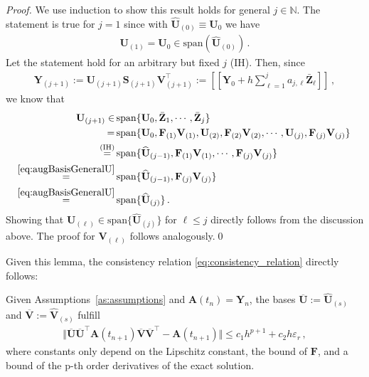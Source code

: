 \documentclass[preprint,runningheads]{svjour3}
\def\wh{\widehat}
\def\wt{\widetilde}
\def\wt{\overline}
\newcommand\bfA{{\mathbf A}}
\newcommand\bfF{{\mathbf F}}
\newcommand\bfS{{\mathbf S}}
\newcommand\bfU{{\mathbf U}}
\newcommand\bfV{{\mathbf V}}
\newcommand\bfY{{\mathbf Y}}
\newcommand\bfZ{{\mathbf Z}}
\begin{document}
\begin{proof}
We use induction to show this result holds for general $j\in\mathbb{N}$. The statement is true for $j=1$ since with $\widehat \bfU_{(0)} \equiv \bfU_{0}$ we have
\begin{align*}
    \bfU_{(1)} = \bfU_{0} \in \text{span}(\widehat \bfU_{(0)})\,.
\end{align*}
Let the statement hold for an arbitrary but fixed $j$ (IH). Then, since
\begin{align}
    \bfY_{(j+1)}:= \bfU_{(j+1)}\bfS_{(j+1)}\bfV_{(j+1)}^{\top} := [\![\bfY_0 + h\sum_{\ell = 1}^{j}a_{j,\ell}\bar \bfZ_{\ell}]\!]\,,
\end{align}
we know that 
\begin{align*}
    \bfU_{(j+1)} \in\,& \text{span}\{ \bfU_0, \bar \bfZ_1, \cdots,  \bar \bfZ_j\}\,\\
    =\,& \text{span}\{ \bfU_0, \bfF_{(1)}\bfV_{(1)},  \bfU_{(2)}, \bfF_{(2)}\bfV_{(2)}, \cdots,  \bfU_{(j)}, \bfF_{(j)}\bfV_{(j)}\}\,\\
    \stackrel{\mathrm{(IH)}}{=}\,& \text{span}\{ \widehat \bfU_{(j-1)}, \bfF_{(1)}\bfV_{(1)}, \cdots,  \bfF_{(j)}\bfV_{(j)}\}\\
    \stackrel{\mathrm{\eqref{eq:augBasisGeneralU}}}{=}\,& \text{span}\{ \widehat \bfU_{(j-1)}, \bfF_{(j)}\bfV_{(j)}\}\\
    \stackrel{\mathrm{\eqref{eq:augBasisGeneralU}}}{=}\,& \text{span}\{ \widehat \bfU_{(j)}\}\,.
\end{align*}
Showing that $\bfU_{(\ell)}\in \text{span}\{ \widehat \bfU_{(j)}\}$ for $\ell\leq j$ directly follows from the discussion above. The proof for $\bfV_{(\ell)}$ follows analogously.\qed
\end{proof}
Given this lemma, the consistency relation \eqref{eq:consistency_relation} directly follows:
\begin{lemma}
    Given Assumptions~\ref{as:assumptions} and $\bfA(t_n) = \bfY_n$, the bases $\wt\bfU := \wh \bfU_{(s)}$ and $\wt\bfV := \wh \bfV_{(s)}$ fulfill
    \begin{align*}
        \Vert\wt \bfU\wt \bfU^{\top} \bfA(t_{n+1}) \wt \bfV\wt \bfV^{\top} - \bfA(t_{n+1})\Vert \leq c_1 h^{p+1} + c_2 h\varepsilon_r\,,
    \end{align*}
    where constants only depend on the Lipschitz constant, the bound of $\bfF$, and a bound of {the p-th order} derivatives of the exact solution.
\end{lemma}
\end{document}
